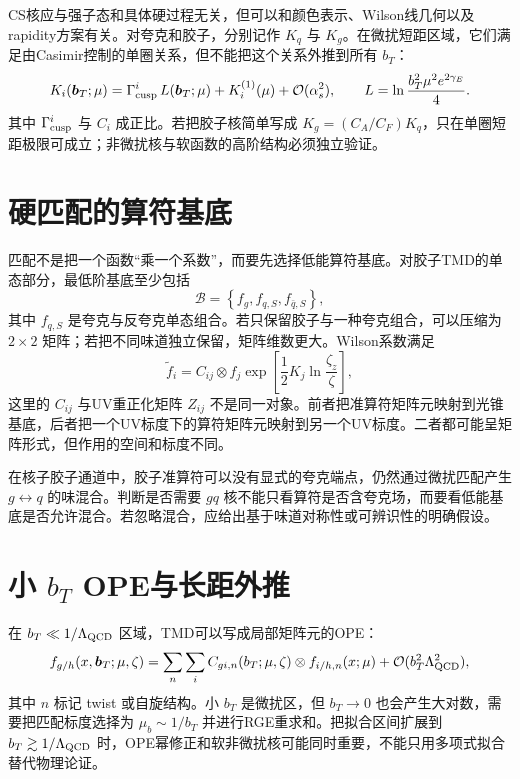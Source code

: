 \documentclass[UTF8,12pt,a4paper,twoside,openany]{ctexbook}
\newcommand{\bT}{\boldsymbol b_T}
\begin{document}
CS核应与强子态和具体硬过程无关，但可以和颜色表示、Wilson线几何以及rapidity方案有关。对夸克和胶子，分别记作 \(K_q\) 与 \(K_g\)。在微扰短距区域，它们满足由Casimir控制的单圈关系，但不能把这个关系外推到所有 \(b_T\)：
\begin{equation}
  K_i(\bT;\mu)
  =\Gamma_{\rm cusp}^i\,L(\bT;\mu)+K_i^{(1)}(\mu)
  +\mathcal O(\alpha_s^2),
  \qquad
  L=\ln\frac{b_T^2\mu^2e^{2\gamma_E}}4.
  \label{eq:cs-perturbative}
\end{equation}
其中 \(\Gamma_{\rm cusp}^i\) 与 \(C_i\) 成正比。若把胶子核简单写成 \(K_g=(C_A/C_F)K_q\)，只在单圈短距极限可成立；非微扰核与软函数的高阶结构必须独立验证。

\section{硬匹配的算符基底}

匹配不是把一个函数“乘一个系数”，而要先选择低能算符基底。对胶子TMD的单态部分，最低阶基底至少包括
\begin{equation}
  \mathcal B=\left\{f_g,f_{q,S},f_{\bar q,S}\right\},
  \label{eq:tmd-basis}
\end{equation}
其中 \(f_{q,S}\) 是夸克与反夸克单态组合。若只保留胶子与一种夸克组合，可以压缩为 \(2\times2\) 矩阵；若把不同味道独立保留，矩阵维数更大。Wilson系数满足
\begin{equation}
  \widetilde f_i
  =C_{ij}\otimes f_j
  \exp\left[\frac12K_j\ln\frac{\zeta_z}{\zeta}\right],
  \label{eq:matching-basis}
\end{equation}
这里的 \(C_{ij}\) 与UV重正化矩阵 \(Z_{ij}\) 不是同一对象。前者把准算符矩阵元映射到光锥基底，后者把一个UV标度下的算符矩阵元映射到另一个UV标度。二者都可能呈矩阵形式，但作用的空间和标度不同。

在核子胶子通道中，胶子准算符可以没有显式的夸克端点，仍然通过微扰匹配产生 \(g\leftrightarrow q\) 的味混合。判断是否需要 \(gq\) 核不能只看算符是否含夸克场，而要看低能基底是否允许混合。若忽略混合，应给出基于味道对称性或可辨识性的明确假设。

\section{\texorpdfstring{小 \(b_T\) OPE与长距外推}{小 bT OPE 与长距外推}}

在 \(b_T\ll1/\Lambda_{\rm QCD}\) 区域，TMD可以写成局部矩阵元的OPE：
\begin{equation}
  f_{g/h}(x,\bT;\mu,\zeta)
  =\sum_{n}\sum_{i}
  C_{g i,n}(b_T;\mu,\zeta)\otimes
  f_{i/h,n}(x;\mu)+\mathcal O(b_T^2\Lambda_{\rm QCD}^2),
  \label{eq:small-b-ope}
\end{equation}
其中 \(n\) 标记 twist 或自旋结构。小 \(b_T\) 是微扰区，但 \(b_T\to0\) 也会产生大对数，需要把匹配标度选择为 \(\mu_b\sim1/b_T\) 并进行RGE重求和。把拟合区间扩展到 \(b_T\gtrsim1/\Lambda_{\rm QCD}\) 时，OPE幂修正和软非微扰核可能同时重要，不能只用多项式拟合替代物理论证。
\end{document}
